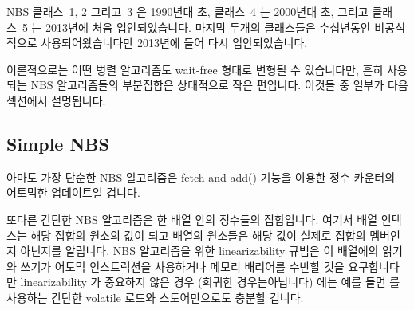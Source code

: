 NBS 클래스~1, 2 그리고~3 은 1990년대 초, 클래스~4 는 2000년대 초, 그리고
클래스~5 는 2013년에 처음 입안되었습니다.
마지막 두개의 클래스들은 수십년동안 비공식적으로 사용되어왔습니다만 2013년에
들어 다시 입안되었습니다.

이론적으로는 어떤 병렬 알고리즘도 wait-free 형태로 변형될 수 있습니다만, 흔히
사용되는 NBS 알고리즘들의 부분집합은 상대적으로 작은 편입니다.
이것들 중 일부가 다음 섹션에서 설명됩니다.
\iffalse

NBS classes~1, 2 and~3 were first formulated in the early 1990s,
class~4 was first formulated in the early 2000s,
and class~5 was first formulated in 2013.
The final two classes have seen informal use for a great many decades,
but were reformulated in 2013.

In theory, any parallel algorithm can be cast into wait-free form,
but there are a relatively small subset of NBS algorithms that are
in common use.
A few of these are listed in the following section.
\fi

\subsection{Simple NBS}
\label{sec:advsync:Simple NBS}

아마도 가장 단순한 NBS 알고리즘은 fetch-and-add()
기능을 이용한 정수 카운터의 어토믹한 업데이트일 겁니다.

또다른 간단한 NBS 알고리즘은 한 배열 안의 정수들의 집합입니다.
여기서 배열 인덱스는 해당 집합의 원소의 값이 되고 배열의 원소들은 해당 값이
실제로 집합의 멤버인지 아닌지를 알립니다.
NBS 알고리즘을 위한 linearizability 규범은 이 배열에의 읽기와 쓰기가 어토믹
인스트럭션을 사용하거나 메모리 배리어를 수반할 것을 요구합니다만
linearizability 가 중요하지 않은 경우 (희귀한 경우는아닙니다) 에는 예를 들면
 를 사용하는 간단한 volatile 로드와 스토어만으로도 충분할
겁니다.
\iffalse

Perhaps the simplest NBS algorithm is atomic update of an integer
counter using fetch-and-add (\co{atomic_add_return()}) primitives.

Another simple NBS algorithm implements a set of integers in an array.
Here the array index indicates a value that might be a member of the set
and the array element indicates whether or not that value actually is
a set member.
The linearizability criterion for NBS algorithms requires that reads from
and updates to the array either use atomic instructions or be accompanied
by memory barriers, but in the not-uncommon case where linearizability
is not important, simple volatile loads and stores suffice, for example,
using \co{ACCESS_ONCE()}.
\fi

